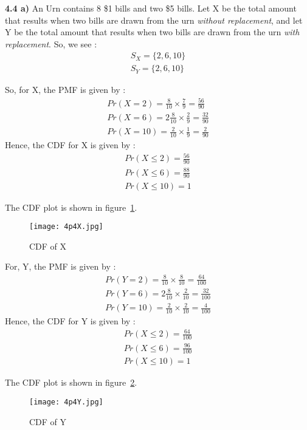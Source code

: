 \documentclass{article}
\begin{document}
\vspace{5 mm }

{\bf 4.4 a)} An Urn contains 8 \$1 bills and two \$5 bills. Let X be the total amount that results when two bills are drawn from the urn \textit{without replacement}, and let Y be the total amount that results when two bills are drawn from the urn \textit{with replacement}. So, we see : 
\begin{align*}
S_X = \{2 , 6, 10\} \\
S_Y = \{2, 6, 10 \} 
\end{align*}

So, for X, the PMF is given by : 
\begin{align*}
Pr(X=2) = \frac{8}{10} \times \frac{7}{9} = \frac{56}{90} \\
Pr(X=6) = 2 \frac{8}{10} \times \frac{2}{9} = \frac{32}{90} \\
Pr(X=10) = \frac{2}{10} \times \frac{1}{9} = \frac{2}{90} 
\end{align*}
Hence, the CDF for X is given by : 
\begin{align*}
Pr(X \leq 2) =  \frac{56}{90} \\
Pr(X \leq 6) =  \frac{88}{90} \\
Pr(X \leq 10) = 1 
\end{align*}

The CDF plot is shown in figure~\ref{Xcdf}.

\begin{figure} [h!]
\centering
\texttt{[image: 4p4X.jpg]}
\caption{CDF of X}
\label{Xcdf}
\end{figure}

For, Y, the PMF is given by : 
\begin{align*}
Pr(Y=2) = \frac{8}{10} \times \frac{8}{10} = \frac{64}{100} \\
Pr(Y=6) = 2 \frac{8}{10} \times \frac{2}{10} = \frac{32}{100} \\
Pr(Y=10) = \frac{2}{10} \times \frac{2}{10} = \frac{4}{100} 
\end{align*}
Hence, the CDF for Y is given by : 
\begin{align*}
Pr(X \leq 2) =  \frac{64}{100} \\
Pr(X \leq 6) =  \frac{96}{100} \\
Pr(X \leq 10) = 1 
\end{align*}

The CDF plot is shown in figure~\ref{Ycdf}.

\begin{figure} [h!]
\centering
\texttt{[image: 4p4Y.jpg]}
\caption{CDF of Y}
\label{Ycdf}
\end{figure}
\end{document}
